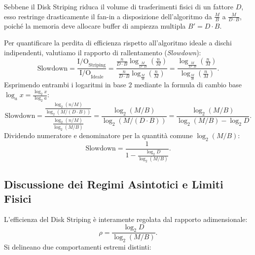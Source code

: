 Sebbene il Disk Striping riduca il volume di trasferimenti fisici di un fattore $D$, esso restringe drasticamente il fan-in a disposizione dell'algoritmo da $\frac{M}{B}$ a $\frac{M}{D \cdot B}$, poiché la memoria deve allocare buffer di ampiezza multipla $B' = D \cdot B$.

Per quantificare la perdita di efficienza rispetto all'algoritmo ideale a dischi indipendenti, valutiamo il rapporto di rallentamento (\textit{Slowdown}):
\begin{equation}
  \text{Slowdown} = \frac{\mathrm{I/O}_{\text{Striping}}}{\mathrm{I/O}_{\text{Ideale}}}
  = \frac{\displaystyle \frac{n}{D \cdot B} \log_{\frac{M}{D \cdot B}}\left(\frac{n}{M}\right)}{\displaystyle \frac{n}{D \cdot B} \log_{\frac{M}{B}}\left(\frac{n}{M}\right)}
  = \frac{\log_{\frac{M}{D \cdot B}}\left(\frac{n}{M}\right)}{\log_{\frac{M}{B}}\left(\frac{n}{M}\right)}.
\end{equation}
Esprimendo entrambi i logaritmi in base $2$ mediante la formula di cambio base $\log_a x = \frac{\log_2 x}{\log_2 a}$:
\begin{equation}
  \text{Slowdown} = \frac{\displaystyle \frac{\log_2(n / M)}{\log_2(M / (D \cdot B))}}{\displaystyle \frac{\log_2(n / M)}{\log_2(M / B)}}
  = \frac{\log_2(M / B)}{\log_2(M / (D \cdot B))}
  = \frac{\log_2(M / B)}{\log_2(M / B) - \log_2 D}.
\end{equation}
Dividendo numeratore e denominatore per la quantità comune $\log_2(M / B)$:
\begin{equation}
  \text{Slowdown} = \frac{1}{\displaystyle 1 - \frac{\log_2 D}{\log_2(M / B)}}.
  \label{eq:slowdown-formula}
\end{equation}

\subsection{Discussione dei Regimi Asintotici e Limiti Fisici}
\label{subsec:striping-limits}

L'efficienza del Disk Striping è interamente regolata dal rapporto adimensionale:
\begin{equation}
  \rho = \frac{\log_2 D}{\log_2(M / B)}.
\end{equation}
Si delineano due comportamenti estremi distinti:

